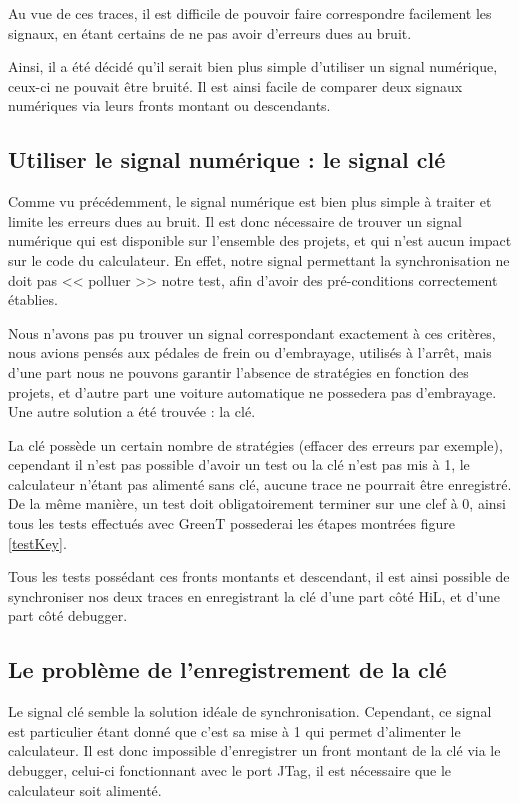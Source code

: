 Au vue de ces traces, il est difficile de pouvoir faire correspondre facilement les signaux, en étant certains de ne pas avoir d'erreurs dues au bruit. 

Ainsi, il a été décidé qu'il serait bien plus simple d'utiliser un signal numérique, ceux-ci ne pouvait être bruité. Il est ainsi facile de comparer deux signaux numériques via leurs fronts montant ou descendants. 


\subsection{Utiliser le signal numérique : le signal clé}
Comme vu précédemment, le signal numérique est bien plus simple à traiter et limite les erreurs dues au bruit. Il est donc nécessaire de trouver un signal numérique qui est disponible sur l'ensemble des projets, et qui n'est aucun impact sur le code du calculateur. En effet, notre signal permettant la synchronisation ne doit pas << polluer >> notre test, afin d'avoir des pré-conditions correctement établies. 

Nous n'avons pas pu trouver un signal correspondant exactement à ces critères, nous avions pensés aux pédales de frein ou d'embrayage, utilisés à l'arrêt, mais d'une part nous ne pouvons garantir l'absence de stratégies en fonction des projets, et d'autre part une voiture automatique ne possedera pas d'embrayage. Une autre solution a été trouvée : la clé.

La clé possède un certain nombre de stratégies (effacer des erreurs par exemple), cependant il n'est pas possible d'avoir un test ou la clé n'est pas mis à 1, le calculateur n'étant pas alimenté sans clé, aucune trace ne pourrait être enregistré. De la même manière, un test doit obligatoirement terminer sur une clef à 0, ainsi tous les tests effectués avec GreenT possederai les étapes montrées figure \ref{testKey}. 


Tous les tests possédant ces fronts montants et descendant, il est ainsi possible de synchroniser nos deux traces en enregistrant la clé d'une part côté HiL, et d'une part côté debugger. 

\subsection{Le problème de l'enregistrement de la clé}
Le signal clé semble la solution idéale de synchronisation. Cependant, ce signal est particulier étant donné que c'est sa mise à 1 qui permet d'alimenter le calculateur. Il est donc impossible d'enregistrer un front montant de la clé via le debugger, celui-ci fonctionnant avec le port JTag, il est nécessaire que le calculateur soit alimenté. 

